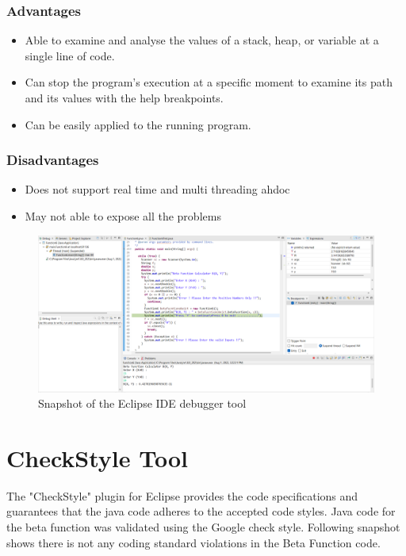 \documentclass[12pt,a4paper]{report}
\begin{document}
\subsubsection{Advantages}
    \begin{itemize}[noitemsep]
        \item Able to examine and analyse the values of a stack, heap, or variable at a single line of code.
        \item Can stop the program's execution at a specific moment to examine its path and its values with the help breakpoints.
        \item Can be easily applied to the running program.
    \end{itemize}
\subsubsection{Disadvantages}
     \begin{itemize}[noitemsep]
        \item Does not support real time and multi threading ahdoc
        \item May not able to expose all the problems
    \end{itemize}


\begin{figure}[h]
    \centering
    \begin{center}
    \includegraphics[width=0.73\linewidth]{Images/Debugger_snapshot.png}    
    \end{center}
    \caption{Snapshot of the Eclipse IDE debugger tool }
    \label{fig:Eclipse Debugger Tool snapshot.}
\end{figure}

\newpage
\section{CheckStyle Tool}
The "CheckStyle" plugin for Eclipse provides the code specifications and guarantees that the java code adheres to the accepted code styles. Java code for the beta function was validated using the Google check style. Following snapshot shows there is not any coding standard violations in the Beta Function code.\\
\end{document}
